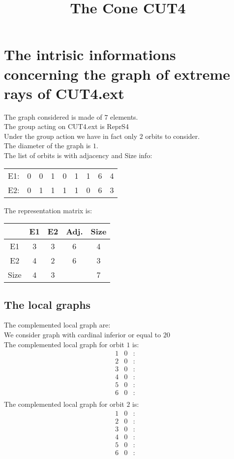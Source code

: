 \documentclass[12pt]{article}
\title{The Cone CUT4}
\begin{document}
\maketitle
\section{The intrisic informations concerning the graph of extreme rays of CUT4.ext}
The graph considered is made of $7$ elements.\\
The group acting on CUT4.ext is ReprS4\\
Under the group action we have in fact only $2$ orbits to consider.\\
The diameter of the graph is $1$.\\
The list of orbits is with adjacency and Size info:
\begin{center}
\scriptsize
\begin{tabular}{ccccccc|c|c}
E1:&0&0&1&0&1&1&6&4\\
E2:&0&1&1&1&1&0&6&3\\
\end{tabular}
\end{center}
The representation matrix is:
\begin{center}
\scriptsize
\begin{tabular}{|c|cc|c|c|}
\hline
&E1&E2&Adj.&Size\\
\hline
E1& 3& 3&6&4\\
E2& 4& 2&6&3\\
\hline
Size&4&3&&7\\
\hline
\end{tabular}
\end{center}
\subsection{The local graphs}
The complemented local graph are:\\
We consider graph with cardinal inferior or equal to $20$\\
The complemented local graph for orbit $1$ is:
\begin{equation*}
\begin{array}{rrcl}
1&0&:&\\
2&0&:&\\
3&0&:&\\
4&0&:&\\
5&0&:&\\
6&0&:&\\
\end{array}
\end{equation*}
The complemented local graph for orbit $2$ is:
\begin{equation*}
\begin{array}{rrcl}
1&0&:&\\
2&0&:&\\
3&0&:&\\
4&0&:&\\
5&0&:&\\
6&0&:&\\
\end{array}
\end{equation*}
\end{document}
